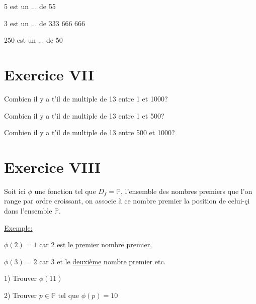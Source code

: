 \documentclass[french]{article}
\begin{document}
5 est un ... de 55

3 est un ... de 333 666 666

250 est un ... de 50

\section*{Exercice VII}
Combien il y a t'il de multiple de 13 entre 1 et 1000?

Combien il y a t'il de multiple de 13 entre 1 et 500?

Combien il y a t'il de multiple de 13 entre 500 et 1000? \vspace{1.8cm}



\section*{Exercice VIII}
Soit ici $\phi$ une fonction tel que $D_f=\mathbb{P}$, l'ensemble des nombres premiers que l'on range par ordre croissant, on associe à ce nombre premier la position de celui-çi dans l'ensemble $\mathbb{P}$.


\underline{Exemple:} 

$\phi(2)=1$ car $2$ est le \underline{premier} nombre premier,

 
$\phi(3)=2$ car $3$ et le \underline{deuxième} nombre premier etc.

1) Trouver $\phi(11)$ 

2) Trouver $p \in \mathbb{P}$ tel que $\phi(p)=10$
\end{document}
